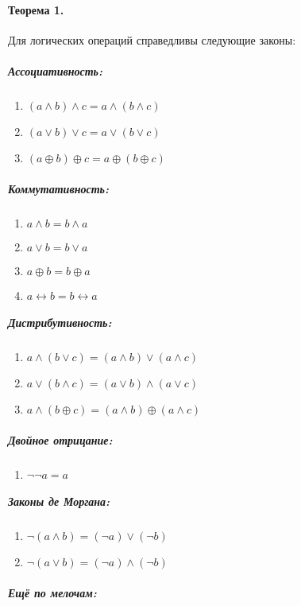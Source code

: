 \paragraph{Теорема 1.} Для логических операций справедливы следующие законы:

\subparagraph{Ассоциативность:}

\begin{enumerate}
\item $(a \wedge b) \wedge c = a \wedge (b \wedge c)$
\item $(a \vee b) \vee c = a \vee (b \vee c)$
\item $(a \oplus b) \oplus c = a \oplus (b \oplus c)$
\end{enumerate}

\subparagraph{Коммутативность:}

\begin{enumerate}
\item $a \wedge b = b \wedge a$
\item $a \vee b = b \vee a$
\item $a \oplus b = b \oplus a$
\item $a \leftrightarrow b = b \leftrightarrow a$
\end{enumerate}

\subparagraph{Дистрибутивность:}

\begin{enumerate}
\item $a \wedge (b \vee c) = (a \wedge b) \vee (a \wedge c)$
\item $a \vee (b \wedge c) = (a \vee b) \wedge (a \vee c)$
\item $a \wedge (b \oplus c) = (a \wedge b) \oplus (a \wedge c)$
\end{enumerate}

\subparagraph{Двойное отрицание:}

\begin{enumerate}
\item $\neg\neg a = a$
\end{enumerate}

\subparagraph{Законы де Моргана:}

\begin{enumerate}
\item $\neg (a \wedge b) = (\neg a) \vee (\neg b)$
\item $\neg (a \vee b) = (\neg a) \wedge (\neg b)$
\end{enumerate}

\subparagraph{Ещё по мелочам:}

